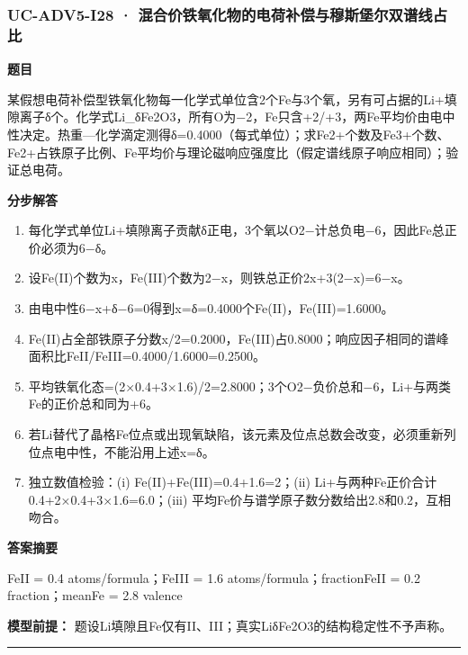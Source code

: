\documentclass[UTF8,11pt,a4paper]{ctexart}
\begin{document}
\subsubsection*{UC-ADV5-I28 · 混合价铁氧化物的电荷补偿与穆斯堡尔双谱线占比}
\noindent\textbf{题目}\par
某假想电荷补偿型铁氧化物每一化学式单位含2个Fe与3个氧，另有可占据的Li+填隙离子δ个。化学式Li\_δFe2O3，所有O为−2，Fe只含+2/+3，两Fe平均价由电中性决定。热重—化学滴定测得δ=0.4000（每式单位）；求Fe2+个数及Fe3+个数、Fe2+占铁原子比例、Fe平均价与理论磁响应强度比（假定谱线原子响应相同）；验证总电荷。\par
\medskip\noindent\textbf{分步解答}
\begin{enumerate}
\item 每化学式单位Li+填隙离子贡献δ正电，3个氧以O2−计总负电−6，因此Fe总正价必须为6−δ。
\item 设Fe(II)个数为x，Fe(III)个数为2−x，则铁总正价2x+3(2−x)=6−x。
\item 由电中性6−x+δ−6=0得到x=δ=0.4000个Fe(II)，Fe(III)=1.6000。
\item Fe(II)占全部铁原子分数x/2=0.2000，Fe(III)占0.8000；响应因子相同的谱峰面积比FeII/FeIII=0.4000/1.6000=0.2500。
\item 平均铁氧化态=(2×0.4+3×1.6)/2=2.8000；3个O2−负价总和−6，Li+与两类Fe的正价总和同为+6。
\item 若Li替代了晶格Fe位点或出现氧缺陷，该元素及位点总数会改变，必须重新列位点电中性，不能沿用上述x=δ。
\item 独立数值检验：(i) Fe(II)+Fe(III)=0.4+1.6=2；(ii) Li+与两种Fe正价合计0.4+2×0.4+3×1.6=6.0；(iii) 平均Fe价与谱学原子数分数给出2.8和0.2，互相吻合。
\end{enumerate}
\noindent\textbf{答案摘要}\par
FeII = 0.4 atoms/formula；FeIII = 1.6 atoms/formula；fractionFeII = 0.2 fraction；meanFe = 2.8 valence\par
\noindent\textbf{模型前提：}
题设Li填隙且Fe仅有II、III；真实LiδFe2O3的结构稳定性不予声称。\par
\medskip\hrule\medskip
{}
\end{document}
